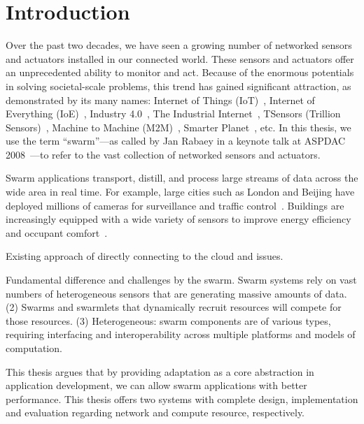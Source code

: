 \documentclass[thesis.tex]{subfiles}
\begin{document}
\chapter{Introduction}

Over the past two decades, we have seen a growing number of networked sensors
and actuators installed in our connected world. These sensors and actuators
offer an unprecedented ability to monitor and act. Because of the enormous
potentials in solving societal-scale problems, this trend has gained significant
attraction, as demonstrated by its many names: Internet of Things
(IoT)~\cite{atzori2010internet}, Internet of Everything
(IoE)~\cite{bradley2013internet}, Industry 4.0~\cite{lasi2014industry}, The
Industrial Internet~\cite{eigner2018industrial}, TSensors (Trillion
Sensors)~\cite{bogue2014towards}, Machine to Machine
(M2M)~\cite{anton2014machine}, Smarter Planet~\cite{palmisano2008smarter}, etc.
In this thesis, we use the term ``swarm''---as called by Jan Rabaey in a keynote
talk at ASPDAC 2008~\cite{rabaey2008brand}---to refer to the vast collection of
networked sensors and actuators.

Swarm applications transport, distill, and process large streams of data across
the wide area in real time. For example, large cities such as London and Beijing
have deployed millions of cameras for surveillance and traffic
control~\cite{skynet, london.surveillance}. Buildings are increasingly equipped
with a wide variety of sensors to improve energy efficiency and occupant
comfort~\cite{krioukov2012building}.

Existing approach of directly connecting to the cloud and issues.

Fundamental difference and challenges by the swarm. Swarm systems rely on vast
numbers of heterogeneous sensors that are generating massive amounts of
data. (2) Swarms and swarmlets that dynamically recruit resources will compete
for those resources. (3) Heterogeneous: swarm components are of various types,
requiring interfacing and interoperability across multiple platforms and models
of computation.

This thesis argues that by providing adaptation as a core abstraction in
application development, we can allow swarm applications with better
performance. This thesis offers two systems with complete design, implementation
and evaluation regarding network and compute resource,
respectively.

\vspace{1em}
\end{document}
